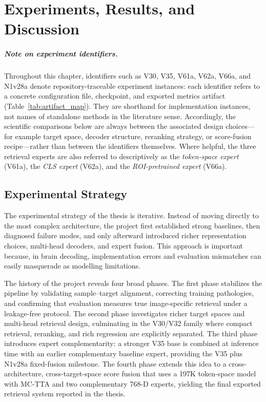 
\chapter{Experiments, Results, and Discussion}
\label{chap:experiments}

\paragraph{Note on experiment identifiers.}\label{par:experiment_id_note}
Throughout this chapter, identifiers such as V30, V35, V61a, V62a, V66a, and N1v28a denote repository-traceable experiment instances: each identifier refers to a concrete configuration file, checkpoint, and exported metrics artifact (Table~\ref{tab:artifact_map}). They are shorthand for implementation instances, not names of standalone methods in the literature sense. Accordingly, the scientific comparisons below are always between the associated design choices---for example target space, decoder structure, reranking strategy, or score-fusion recipe---rather than between the identifiers themselves. Where helpful, the three retrieval experts are also referred to descriptively as the \emph{token-space expert} (V61a), the \emph{CLS expert} (V62a), and the \emph{ROI-pretrained expert} (V66a).

\section{Experimental Strategy}

The experimental strategy of the thesis is iterative. Instead of moving directly to the most complex architecture, the project first established strong baselines, then diagnosed failure modes, and only afterward introduced richer representation choices, multi-head decoders, and expert fusion. This approach is important because, in brain decoding, implementation errors and evaluation mismatches can easily masquerade as modelling limitations.

The history of the project reveals four broad phases. The first phase stabilizes the pipeline by validating sample--target alignment, correcting training pathologies, and confirming that evaluation measures true image-specific retrieval under a leakage-free protocol. The second phase investigates richer target spaces and multi-head retrieval design, culminating in the V30/V32 family where compact retrieval, reranking, and rich regression are explicitly separated. The third phase introduces expert complementarity: a stronger V35 base is combined at inference time with an earlier complementary baseline expert, providing the V35 plus N1v28a fixed-fusion milestone. The fourth phase extends this idea to a cross-architecture, cross-target-space score fusion that uses a 197K token-space model with MC-TTA and two complementary 768-D experts, yielding the final exported retrieval system reported in the thesis.

